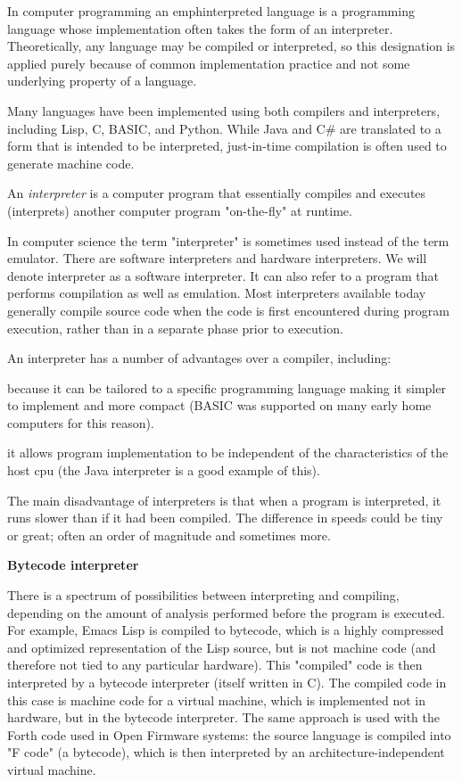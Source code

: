 In computer programming an emph{interpreted language} is a programming language whose implementation often takes the form of an interpreter. Theoretically, any language may be compiled or interpreted, so this designation is applied purely because of common implementation practice and not some underlying property of a language.

Many languages have been implemented using both compilers and interpreters, including Lisp, C, BASIC, and Python. While Java and C\# are translated to a form that is intended to be interpreted, just-in-time compilation is often used to generate machine code.

An \emph{interpreter} is a computer program that essentially compiles and executes (interprets) another computer program "on-the-fly" at runtime.

In computer science the term "interpreter" is sometimes used instead of the term emulator. There are software interpreters and hardware interpreters. We will denote interpreter as a software interpreter. It can also refer to a program that performs compilation as well as emulation. Most interpreters available today generally compile source code when the code is first encountered during program execution, rather than in a separate phase prior to execution.

An interpreter has a number of advantages over a compiler, including:
\begin{pitemize}
	\item because it can be tailored to a specific programming language making it simpler to implement and more compact (BASIC was supported on many early home computers for this reason).
	\item it allows program implementation to be independent of the characteristics of the host cpu (the Java interpreter is a good example of this).
\end{pitemize}

The main disadvantage of interpreters is that when a program is interpreted, it runs slower than if it had been compiled. The difference in speeds could be tiny or great; often an order of magnitude and sometimes more.

\medskip\textbf{Bytecode interpreter}

There is a spectrum of possibilities between interpreting and compiling, depending on the amount of analysis performed before the program is executed. For example, Emacs Lisp is compiled to bytecode, which is a highly compressed and optimized representation of the Lisp source, but is not machine code (and therefore not tied to any particular hardware). This "compiled" code is then interpreted by a bytecode interpreter (itself written in C). The compiled code in this case is machine code for a virtual machine, which is implemented not in hardware, but in the bytecode interpreter. The same approach is used with the Forth code used in Open Firmware systems: the source language is compiled into "F code" (a bytecode), which is then interpreted by an architecture-independent virtual machine.

